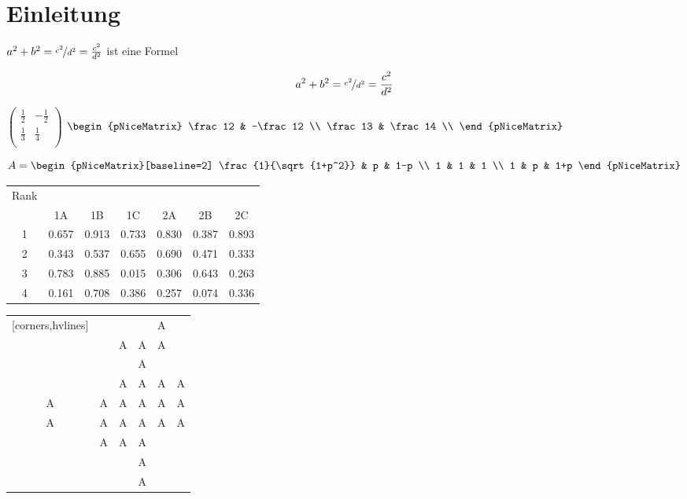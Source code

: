 \documentclass[12pt,ngerman]{scrreprt}
\begin{document}
\chapter{Einleitung}

\(a^2+b^2 = \nicefrac{c^2}{d^2}  = \frac{c^2}{d^2} \) ist eine Formel

\[ a^2 + b^2 = \nicefrac{c^2}{d^2}  = \frac{c^2}{d^2} \] 


$\begin{pmatrix}
\frac12 & -\frac12 \\
\frac13 & \frac14 \\
\end{pmatrix}$
$\begin{pNiceMatrix}
\frac12 & -\frac12 \\
\frac13 & \frac14 \\
\end{pNiceMatrix}$


\begin{equation}
A = \begin{pNiceMatrix}[baseline=2] %
\frac{1}{\sqrt{1+p^2}} & p & 1-p \\
1 & 1 & 1 \\
1 & p & 1+p
\end{pNiceMatrix}
\end{equation}


\begin{NiceTabular}{@{}c!{\qquad}ccc!{\qquad}ccc@{}}
\toprule
Rank &  & & &  \\
& 1A & 1B & 1C & 2A & 2B & 2C \\
 & 0.657 & 0.913 & 0.733 & 0.830 & 0.387 & 0.893\\
2 & 0.343 & 0.537 & 0.655 & 0.690 & 0.471 & 0.333\\
3 & 0.783 & 0.885 & 0.015 & 0.306 & 0.643 & 0.263\\
4 & 0.161 & 0.708 & 0.386 & 0.257 & 0.074 & 0.336\\
\bottomrule
\end{NiceTabular}


\begin{NiceTabular}{*{6}{c}}[corners,hvlines]
& & & & A \\
& & A & A & A \\
& & & A \\
& & A & A & A & A \\
A & A & A & A & A & A \\
A & A & A & A & A & A \\
& A & A & A \\
&  & & A \\
& & & A \\
\end{NiceTabular}
\end{document}
